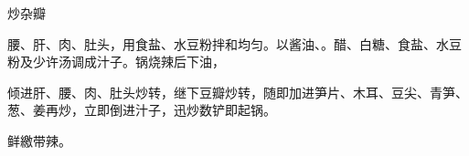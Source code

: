 \begin{recipe}{炒杂瓣}

\ingredients




\cooking

腰、肝、肉、肚头，用食盐、水豆粉拌和均匀。以酱油、。醋、白糖、食盐、水豆粉及少许汤调成汁子。锅烧辣后下油，

倾进肝、腰、肉、肚头炒转，继下豆瓣炒转，随即加进笋片、木耳、豆尖、青笋、葱、姜再炒，立即倒进汁子，迅炒数铲即起锅。

\notes

鲜繳带辣。

\end{recipe}

